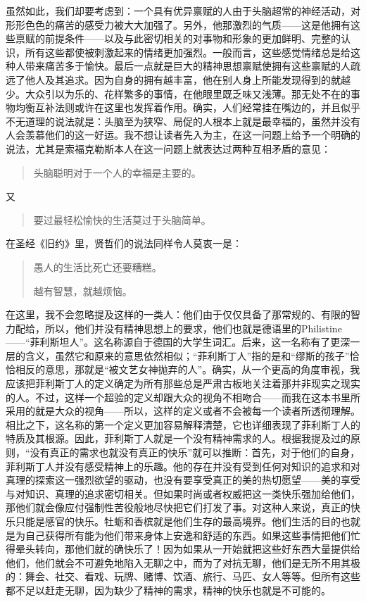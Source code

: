 \documentclass[12pt,oneside]{book}
\begin{document}
虽然如此，我们却要考虑到：一个具有优异禀赋的人由于头脑超常的神经活动，对形形色色的痛苦的感受力被大大加强了。另外，他那激烈的气质——这是他拥有这些禀赋的前提条件——以及与此密切相关的对事物和形象的更加鲜明、完整的认识，所有这些都使被刺激起来的情绪更加强烈。一般而言，这些感觉情绪总是给这种人带来痛苦多于愉快。最后一点就是巨大的精神思想禀赋使拥有这些禀赋的人疏远了他人及其追求。因为自身的拥有越丰富，他在别人身上所能发现得到的就越少。大众引以为乐的、花样繁多的事情，在他眼里既乏味又浅薄。那无处不在的事物均衡互补法则或许在这里也发挥着作用。确实，人们经常挂在嘴边的，并且似乎不无道理的说法就是：头脑至为狭窄、局促的人根本上就是最幸福的，虽然并没有人会羡慕他们的这一好运。我不想让读者先入为主，在这一问题上给予一个明确的说法，尤其是索福克勒斯本人在这一问题上就表达过两种互相矛盾的意见： 

\begin{quotation}
头脑聪明对于一个人的幸福是主要的。 
\end{quotation}


又 

\begin{quotation}
要过最轻松愉快的生活莫过于头脑简单。 
\end{quotation}

 

在圣经《旧约》里，贤哲们的说法同样令人莫衷一是： 

\begin{quotation}
愚人的生活比死亡还要糟糕。

越有智慧，就越烦恼。 
\end{quotation}


在这里，我不会忽略提及这样的一类人：他们由于仅仅具备了那常规的、有限的智力配给，所以，他们并没有精神思想上的要求，他们也就是德语里的Philistine——“菲利斯坦人”。这名称源自于德国的大学生词汇。后来，这一名称有了更深一层的含义，虽然它和原来的意思依然相似；“菲利斯丁人”指的是和“缪斯的孩子”恰恰相反的意思，那就是“被文艺女神抛弃的人”。确实，从一个更高的角度审视，我应该把菲利斯丁人的定义确定为所有那些总是严肃古板地关注着那并非现实之现实的人。不过，这样一个超验的定义却跟大众的视角不相吻合——而我在这本书里所采用的就是大众的视角——所以，这样的定义或者不会被每一个读者所透彻理解。相比之下，这名称的第一个定义更加容易解释清楚，它也详细表现了菲利斯丁人的特质及其根源。因此，菲利斯丁人就是一个没有精神需求的人。根据我提及过的原则，“没有真正的需求也就没有真正的快乐”就可以推断：首先，对于他们的自身，菲利斯丁人并没有感受精神上的乐趣。他的存在并没有受到任何对知识的追求和对真理的探索这一强烈欲望的驱动，也没有要享受真正的美的热切愿望——美的享受与对知识、真理的追求密切相关。但如果时尚或者权威把这一类快乐强加给他们，那他们就会像应付强制性苦役般地尽快把它们打发了事。对这种人来说，真正的快乐只能是感官的快乐。牡蛎和香槟就是他们生存的最高境界。他们生活的目的也就是为自己获得所有能为他们带来身体上安逸和舒适的东西。如果这些事情把他们忙得晕头转向，那他们就的确快乐了！因为如果从一开始就把这些好东西大量提供给他们，他们就会不可避免地陷入无聊之中，而为了对抗无聊，他们是无所不用其极的：舞会、社交、看戏、玩牌、赌博、饮酒、旅行、马匹、女人等等。但所有这些都不足以赶走无聊，因为缺少了精神的需求，精神的快乐也就是不可能的。
\end{document}
